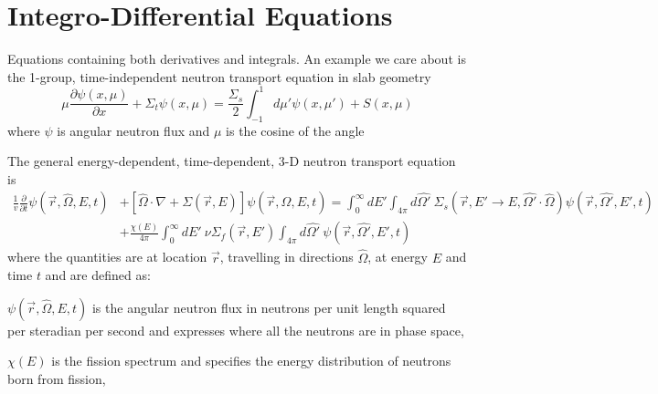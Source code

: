 \documentclass[12pt]{article}
\newcommand{\Macro}{\ensuremath{\Sigma}}
\begin{document}


\section{Integro-Differential Equations}

Equations containing both derivatives and integrals. An example we care about is the 1-group, time-independent neutron transport equation in slab geometry
%
\begin{equation}
\mu \frac{\partial \psi(x,\mu)}{\partial x} + \Macro_t \psi(x,\mu) = \frac{\Macro_s}{2} \int_{-1}^1 d\mu' \psi(x, \mu') + S(x, \mu) \nonumber
\end{equation}
%
where $\psi$ is angular neutron flux and $\mu$ is the cosine of the angle

The general energy-dependent, time-dependent, 3-D neutron transport equation is 
\begin{align}
\frac{1}{v} \frac{\partial}{\partial t}\psi(\vec{r}, \hat{\Omega}, E, t) &+ [\hat{\Omega} \cdot \nabla + \Macro(\vec{r}, E)] \psi(\vec{r}, \hat{\Omega}, E, t)  =  \int_0^{\infty} dE' \int_{4\pi} d\hat{\Omega'} \:\Macro_{s}(\vec{r}, E' \to E, \hat{\Omega'} \cdot \hat{\Omega}) \psi(\vec{r}, \hat{\Omega'}, E', t) \nonumber \\
&+\frac{ \chi(E)}{4 \pi} \int_0^{\infty} dE' \:\nu \Macro_{f}(\vec{r}, E') \int_{4\pi} d\hat{\Omega'} \:\psi(\vec{r}, \hat{\Omega'}, E', t) \nonumber
\end{align}
%
\noindent where the quantities are at location $\vec{r}$, travelling in directions $\hat{\Omega}$, at energy $E$ and time $t$ and are defined as:
\begin{list}{}{\hspace{2em}}
  \item $\psi(\vec{r}, \hat{\Omega}, E, t)$ is the angular neutron flux in neutrons per unit length squared per steradian per second and expresses where all the neutrons are in phase space, 
  \item $\chi(E)$ is the fission spectrum and specifies the energy distribution of neutrons born from fission,
\end{list}

\end{document}
